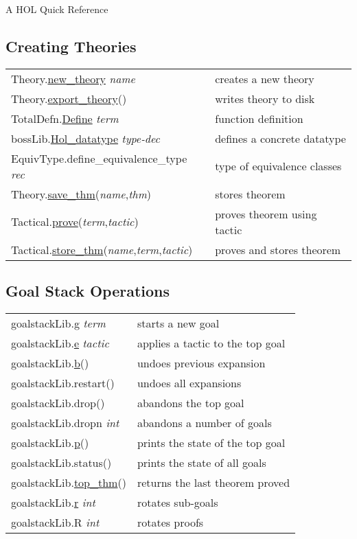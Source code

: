 \documentclass[landscape,10pt]{article}
\newcommand{\hol}[2]{{\sffamily #1.\href{#1.#2.html}{#2}}}
\newcommand{\holnoref}[2]{{\sffamily #1.#2}}
\newcommand{\var}[1]{{\emph{#1}}}
\begin{document}
\begin{center}
\Large A HOL Quick Reference
\end{center}
\footnotesize
\begin{multicols}{3}
\subsection*{Creating Theories}
\begin{tabular}{ll}
\hol{Theory}{new_theory} \var{name} & creates a new theory\\
\hol{Theory}{export_theory}() & writes theory to disk  \\
\hol{TotalDefn}{Define} \var{term} & function definition \\
\hol{bossLib}{Hol_datatype} \var{type-dec} & defines a concrete datatype \\
\holnoref{EquivType}{define_equivalence_type} \var{rec} & type of equivalence classes \\
\hol{Theory}{save_thm}(\var{name},\var{thm}) & stores theorem \\
\hol{Tactical}{prove}(\var{term},\var{tactic}) & proves theorem using tactic \\
\hol{Tactical}{store_thm}(\var{name},\var{term},\var{tactic}) & proves and stores theorem \\
\end{tabular}
\subsection*{Goal Stack Operations}
\begin{tabular}{ll}
\hol{goalstackLib}{g} \var{term} & starts a new goal \\
\hol{goalstackLib}{e} \var{tactic} & applies a tactic to the top goal \\
\hol{goalstackLib}{b}() & undoes previous expansion \\
\holnoref{goalstackLib}{restart}() & undoes all expansions \\
\holnoref{goalstackLib}{drop}() & abandons the top goal \\
\holnoref{goalstackLib}{dropn} \var{int} & abandons a number of goals \\
\hol{goalstackLib}{p}() & prints the state of the top goal \\
\holnoref{goalstackLib}{status}() & prints the state of all goals \\
\hol{goalstackLib}{top_thm}() & returns the last theorem proved \\
\hol{goalstackLib}{r} \var{int} & rotates sub-goals \\
\holnoref{goalstackLib}{R} \var{int} & rotates proofs \\
\end{tabular}

\end{multicols}
\end{document}
